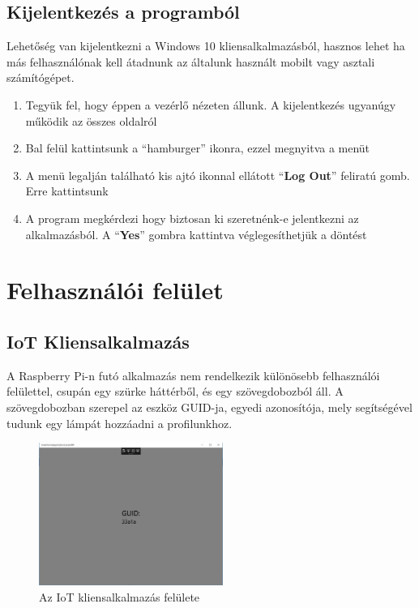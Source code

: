 \documentclass[a4paper,12pt]{report}
\begin{document}
    \subsection{Kijelentkezés a programból}
    Lehetőség van kijelentkezni a Windows 10 kliensalkalmazásból, hasznos lehet ha más felhasználónak kell átadnunk az általunk
    használt mobilt vagy asztali számítógépet.

    \begin{enumerate}
        \item Tegyük fel, hogy éppen a vezérlő nézeten állunk. A kijelentkezés ugyanúgy működik az összes oldalról
        \item Bal felül kattintsunk a ``hamburger'' ikonra, ezzel megnyitva a menüt
        \item A menü legalján található kis ajtó ikonnal ellátott ``\textbf{Log Out}'' feliratú gomb. Erre kattintsunk
        \item A program megkérdezi hogy biztosan ki szeretnénk-e jelentkezni az alkalmazásból. A ``\textbf{Yes}'' gombra kattintva
        véglegesíthetjük a döntést
    \end{enumerate}

    \section{Felhasználói felület}

    \subsection{IoT Kliensalkalmazás}
    A Raspberry Pi-n futó alkalmazás nem rendelkezik különösebb felhasználói felülettel, csupán egy szürke háttérből, és egy
    szövegdobozból áll. A szövegdobozban szerepel az eszköz GUID-ja, egyedi azonosítója, mely segítségével tudunk egy lámpát
    hozzáadni a profilunkhoz.

    \begin{figure}[h!]
        \centering
        \includegraphics[width=6cm]{images/lampuwp.jpg}
        \caption{Az IoT kliensalkalmazás felülete}
        \label{fig: LampUWP}
    \end{figure}
\end{document}
